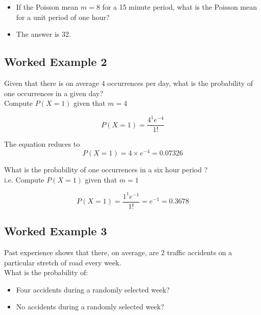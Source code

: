 \documentclass[a4paper,12pt]{article}
\begin{document}
\begin{framed}
	\begin{itemize}
		\item If the Poisson mean $m=8$ for a 15 minute period, what is the Poisson mean for a unit period of one hour?
		\item The answer is 32.
	\end{itemize}
\end{framed}



\subsection*{Worked Example 2}

Given that there is on average 4 occurrences per day, what is the probability of one occurrences in a given day? \\
Compute $P(X=1)$ given that $m=4$

\[ P(X = 1)=\frac{4^1 e^{-4}}{1!} \]


\noindent The equation reduces to
\[ P(X = 1)=4 \times e^{-4} = {0.07326} \]


\noindent What is the probability of one occurrences in a six hour period ? \\ i.e. Compute $P(X=1)$ given that $m=1$

\[ P(X = 1)=\frac{1^1 e^{-1}}{1!}  = e^{-1} = 0.3678\]


\subsection*{Worked Example 3}


Past experience shows that there, on average, are 2 traffic accidents on a particular stretch of road every week. 
\\
\bigskip
What is the probability of: 
\begin{itemize}
	
	\item Four accidents during a randomly selected week?  
	
	\item No accidents during a randomly selected week?  
\end{itemize}
\end{document}
